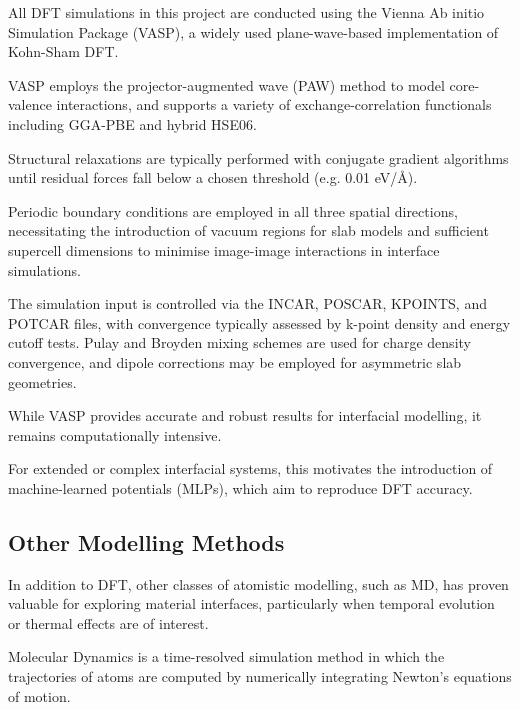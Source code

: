 
All DFT simulations in this project are conducted using the Vienna Ab initio Simulation Package (VASP), a widely used
plane-wave-based implementation of Kohn-Sham DFT.

VASP employs the projector-augmented wave (PAW) method to model core-valence interactions, and supports a variety of
exchange-correlation functionals including GGA-PBE and hybrid HSE06.

Structural relaxations are typically performed with conjugate gradient algorithms until residual forces fall below a
chosen threshold (e.g. 0.01 eV/\AA).


Periodic boundary conditions are employed in all three spatial directions, necessitating the introduction of vacuum
regions for slab models and sufficient supercell dimensions to minimise image-image interactions in interface
simulations.


The simulation input is controlled via the INCAR, POSCAR, KPOINTS, and POTCAR files, with convergence typically assessed
by k-point density and energy cutoff tests. Pulay and Broyden mixing schemes are used for charge density convergence,
and dipole corrections may be employed for asymmetric slab geometries.


While VASP provides accurate and robust results for interfacial modelling, it remains computationally intensive.

For extended or complex interfacial systems, this motivates the introduction of machine-learned potentials (MLPs), which
aim to reproduce DFT accuracy.


\subsection{Other Modelling Methods}


In addition to DFT, other classes of atomistic modelling, such as MD, has proven valuable for exploring material
interfaces, particularly when temporal evolution or thermal effects are of interest.


Molecular Dynamics is a time-resolved simulation method in which the trajectories of atoms are computed by numerically
integrating Newton's equations of motion.

